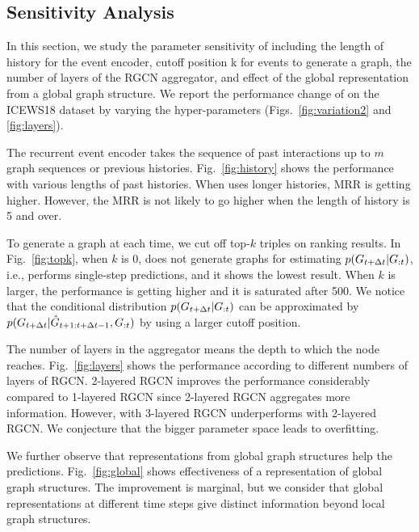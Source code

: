 \subsection{Sensitivity Analysis}
\label{sec:sens}
In this section, we study the parameter sensitivity of \method including the length of history for the event encoder, cutoff position k for events to generate a graph, the number of layers of the RGCN aggregator, and effect of the global representation from a global graph structure.
We report the performance change of \method on the ICEWS18 dataset by varying the hyper-parameters (Figs.~\ref{fig:variation2} and \ref{fig:layers}).


The recurrent event encoder takes the sequence of past interactions up to $m$ graph sequences or previous histories. 
Fig.~\ref{fig:history} shows the performance with various lengths of past histories.
When \method uses longer histories, MRR is getting higher.
However, the MRR is not likely to go higher when the length of history is 5 and over.

To generate a graph at each time, we cut off top-$k$ triples on ranking results.
In Fig.~\ref{fig:topk},
when $k$ is 0, \method does not generate graphs for estimating $p(G_{t+\Delta t}|G_{:t})$, i.e., \method performs single-step predictions, and it shows the lowest result.
When $k$ is larger, the performance is getting higher and it is saturated after 500.
We notice that the conditional distribution $p(G_{t+\Delta t}|G_{:t})$ can be approximated by $p(G_{t+\Delta t}|\allowbreak \hat{G}_{t+1:t+\Delta t -1},G_{:t})$ by using a larger cutoff position.


The number of layers in the aggregator means the depth to which the node reaches.
Fig.~\ref{fig:layers} shows the performance according to different numbers of layers of RGCN.
2-layered RGCN improves the performance considerably compared to 1-layered RGCN since 2-layered RGCN aggregates more information.
However, \method with 3-layered RGCN underperforms \method with 2-layered RGCN. 
We conjecture that the bigger parameter space leads to overfitting.


We further observe that representations from global graph structures help the predictions. Fig.~\ref{fig:global} shows effectiveness of a representation of global graph structures. 
The improvement is marginal, but we consider that global representations at different time steps give distinct information beyond local graph structures.

